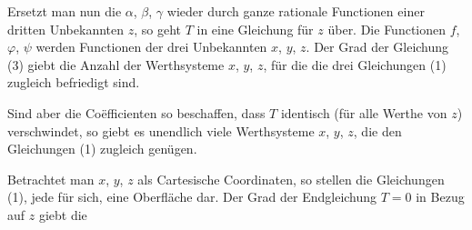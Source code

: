 Ersetzt man nun die $\alpha$, $\beta$, $\gamma$ wieder durch ganze rationale
Functionen einer dritten Unbekannten $z$, so geht $T$ in eine
Gleichung für $z$ über. Die Functionen $f$, $\varphi$, $\psi$ werden Functionen
der drei Unbekannten $x$, $y$, $z$. Der Grad der Gleichung (3) giebt
die Anzahl der Werthsysteme $x$, $y$, $z$, für die die drei Gleichungen
(1) zugleich befriedigt sind.

Sind aber die Coëfficienten so beschaffen, dass $T$ identisch
(für alle Werthe von $z$) verschwindet, so giebt es unendlich viele
Werthsysteme $x$, $y$, $z$, die den Gleichungen (1) zugleich genügen.

Betrachtet man $x$, $y$, $z$ als Cartesische Coordinaten, so
stellen die Gleichungen (1), jede für sich, eine Oberfläche dar.
Der Grad der Endgleichung $T = 0$ in Bezug auf $z$ giebt die
